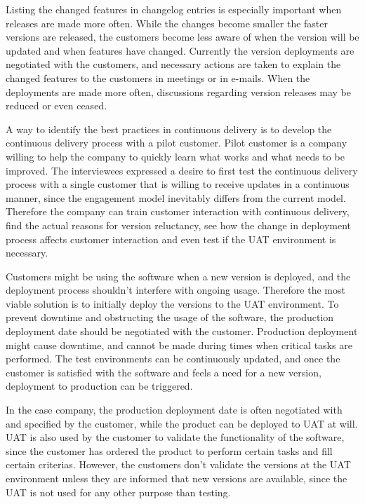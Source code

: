 \documentclass[english]{tktltiki2}
\theoremstyle{definition}
\theoremstyle{remark}
\begin{document}
Listing the changed features in changelog entries is especially important when releases are made more often. While the changes become smaller the faster versions are released, the customers become less aware of when the version will be updated and when features have changed. Currently the version deployments are negotiated with the customers, and necessary actions are taken to explain the changed features to the customers in meetings or in e-mails. When the deployments are made more often, discussions regarding version releases may be reduced or even ceased.  

A way to identify the best practices in continuous delivery is to develop the continuous delivery process with a pilot customer. Pilot customer is a company willing to help the company to quickly learn what works and what needs to be improved. The interviewees expressed a desire to first test the continuous delivery process with a single customer that is willing to receive updates in a continuous manner, since the engagement model inevitably differs from the current model. Therefore the company can train customer interaction with continuous delivery, find the actual reasons for version reluctancy, see how the change in deployment process affects customer interaction and even test if the UAT environment is necessary.

Customers might be using the software when a new version is deployed, and the deployment process shouldn't interfere with ongoing usage. Therefore the most viable solution is to initially deploy the versions to the UAT environment. To prevent downtime and obstructing the usage of the software, the production deployment date should be negotiated with the customer. Production deployment might cause downtime, and cannot be made during times when critical tasks are performed. The test environments can be continuously updated, and once the customer is satisfied with the software and feels a need for a new version, deployment to production can be triggered.  

In the case company, the production deployment date is often negotiated with and specified by the customer, while the product can be deployed to UAT at will. UAT is also used by the customer to validate the functionality of the software, since the customer has ordered the product to perform certain tasks and fill certain criterias. However, the customers don't validate the versions at the UAT environment unless they are informed that new versions are available, since the UAT is not used for any other purpose than testing. 
\end{document}
